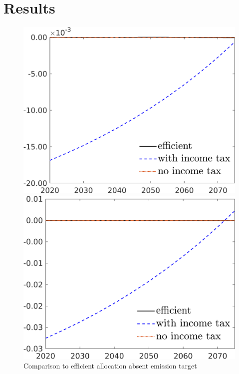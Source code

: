 \section{Results}
\begin{figure}[h!!]
	\centering
	\caption{Comparison to efficient allocation absent emission target }\label{fig:Compno_eff_BN0_notarget}
		\begin{minipage}[]{0.32\textwidth}
		\includegraphics[width=1\textwidth]{../../codding_model/own_basedOnFried/optimalPol_elastS_DisuSci/figures/all_1705/taul_CompEffOPT_NOT_NoTaus_spillover0_sep1_BN0_ineq0_red0_etaa0.79_lgd1.png}
	\end{minipage}
\begin{minipage}[]{0.32\textwidth}
\includegraphics[width=1\textwidth]{../../codding_model/own_basedOnFried/optimalPol_elastS_DisuSci/figures/all_1705/taul_CompEffOPT_NOT_NoTaus_spillover0_noskill1_sep1_BN0_ineq0_red0_etaa0.79_lgd1.png}

\end{minipage}
\end{figure}
